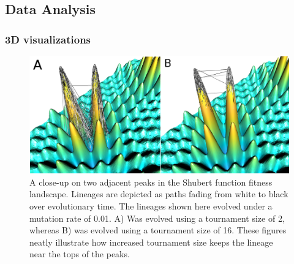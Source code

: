 \documentclass[letterpaper]{article}
\newcommand{\reduceCaptionPadding}{\setlength{\belowcaptionskip}{-10pt}}
\begin{document}


\subsection{Data Analysis}
\subsubsection{3D visualizations}

\begin{figure}
\includegraphics[width=\columnwidth]{figs/shubert_landscape.png}
\reduceCaptionPadding
\caption{\small A close-up on two adjacent peaks in the Shubert function fitness landscape. Lineages are depicted as paths fading from white to black over evolutionary time. The lineages shown here evolved under a mutation rate of 0.01. A) Was evolved using a tournament size of 2, whereas B) was evolved using a tournament size of 16. These figures neatly illustrate how increased tournament size keeps the lineage near the tops of the peaks.}
\label{fig:lineageviz}
\end{figure}


\end{document}
